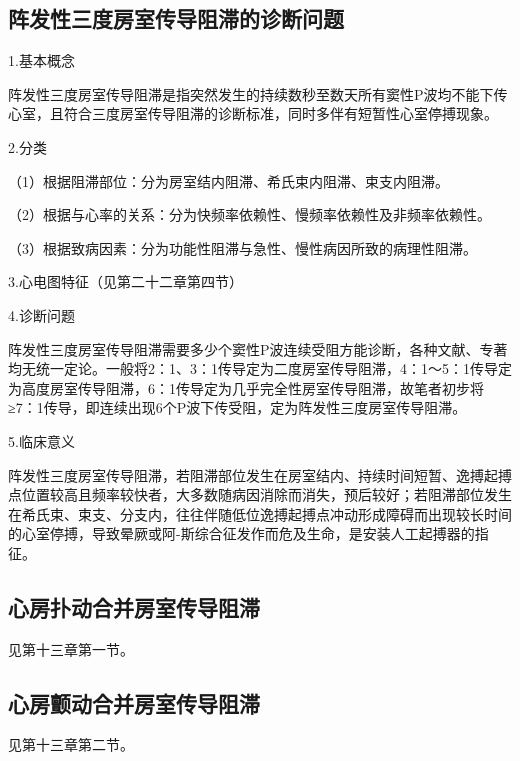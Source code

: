 \protect\hypertarget{text00027.htmlux5cux23subid335}{}{}

\subsection{阵发性三度房室传导阻滞的诊断问题}

1.基本概念

阵发性三度房室传导阻滞是指突然发生的持续数秒至数天所有窦性P波均不能下传心室，且符合三度房室传导阻滞的诊断标准，同时多伴有短暂性心室停搏现象。

2.分类

（1）根据阻滞部位：分为房室结内阻滞、希氏束内阻滞、束支内阻滞。

（2）根据与心率的关系：分为快频率依赖性、慢频率依赖性及非频率依赖性。

（3）根据致病因素：分为功能性阻滞与急性、慢性病因所致的病理性阻滞。

3.心电图特征（见第二十二章第四节）

4.诊断问题

阵发性三度房室传导阻滞需要多少个窦性P波连续受阻方能诊断，各种文献、专著均无统一定论。一般将2：1、3：1传导定为二度房室传导阻滞，4：1～5：1传导定为高度房室传导阻滞，6：1传导定为几乎完全性房室传导阻滞，故笔者初步将≥7：1传导，即连续出现6个P波下传受阻，定为阵发性三度房室传导阻滞。

5.临床意义

阵发性三度房室传导阻滞，若阻滞部位发生在房室结内、持续时间短暂、逸搏起搏点位置较高且频率较快者，大多数随病因消除而消失，预后较好；若阻滞部位发生在希氏束、束支、分支内，往往伴随低位逸搏起搏点冲动形成障碍而出现较长时间的心室停搏，导致晕厥或阿-斯综合征发作而危及生命，是安装人工起搏器的指征。

\protect\hypertarget{text00027.htmlux5cux23subid336}{}{}

\subsection{心房扑动合并房室传导阻滞}

见第十三章第一节。

\protect\hypertarget{text00027.htmlux5cux23subid337}{}{}

\subsection{心房颤动合并房室传导阻滞}

见第十三章第二节。

\protect\hypertarget{text00027.htmlux5cux23subid338}{}{}

